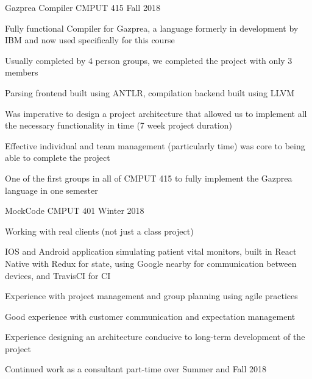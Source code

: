 \begin{cventries}
  \cventry
    {} %
    {Gazprea Compiler} %
    {CMPUT 415} %
    {Fall 2018} %
    {
      \begin{cvitems}
      \item {Fully functional Compiler for Gazprea, a language formerly in development by IBM and now used specifically for this course}
      \item {Usually completed by 4 person groups, we completed the project with only 3 members}
      \item {Parsing frontend built using ANTLR, compilation backend built using LLVM}
      \item {Was imperative to design a project architecture that allowed us to implement all the necessary functionality in time (7 week project duration)}
      \item {Effective individual and team management (particularly time) was core to being able to complete the project}
      \item {One of the first groups in all of CMPUT 415 to fully implement the Gazprea language in one semester}
      \end{cvitems}
    }

  \cventry
    {}
    {MockCode}
    {CMPUT 401}
    {Winter 2018}
    {
      \begin{cvitems}
      \item {Working with real clients (not just a class project)}
      \item {IOS and Android application simulating patient vital monitors, built in React Native 
        with Redux for state, using Google nearby for communication between devices, and TravisCI for CI}
      \item {Experience with project management and group planning using agile practices}
      \item {Good experience with customer communication and expectation management}
      \item {Experience designing an architecture conducive to long-term development of the project}
      \item {Continued work as a consultant part-time over Summer and Fall 2018}
      \end{cvitems}
    }


\end{cventries}
